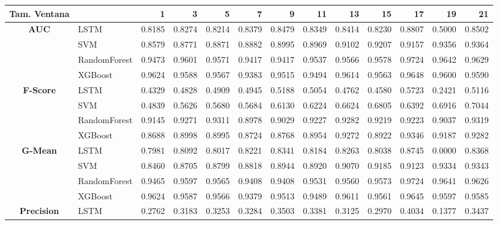 \begin{table}[h]
	\centering
	\begin{adjustbox}{max width=15cm}
		\begin{tabular}{|c|l|r|r|r|r|r|r|r|r|r|r|r|}
			\hline
			\textbf{Tam. Ventana}&         &      1  &      3  &      5  &      7  &      9  &      11 &      13 &      15 &      17 &      19 &      21 \\
			\hline
			\textbf{AUC} & LSTM &  0.8185 &  0.8274 &  0.8214 &  0.8379 &  0.8479 &  0.8349 &  0.8414 &  0.8230 &  0.8807 &  0.5000 &  0.8502 \\
			& SVM &  0.8579 &  0.8771 &  0.8871 &  0.8882 &  0.8995 &  0.8969 &  0.9102 &  0.9207 &  0.9157 &  0.9356 &  0.9364 \\
			& RandomForest &  0.9473 &  0.9601 &  0.9571 &  0.9417 &  0.9417 &  0.9537 &  0.9566 &  0.9578 &  0.9724 &  0.9642 &  0.9629 \\
			& XGBoost &  0.9624 &  0.9588 &  0.9567 &  0.9383 &  0.9515 &  0.9494 &  0.9614 &  0.9563 &  0.9648 &  0.9600 &  0.9590 \\
			\hline
			\textbf{F-Score} & LSTM &  0.4329 &  0.4828 &  0.4909 &  0.4945 &  0.5188 &  0.5054 &  0.4762 &  0.4580 &  0.5723 &  0.2421 &  0.5116 \\
			& SVM &  0.4839 &  0.5626 &  0.5680 &  0.5684 &  0.6130 &  0.6224 &  0.6624 &  0.6805 &  0.6392 &  0.6916 &  0.7044 \\
			& RandomForest &  0.9145 &  0.9271 &  0.9311 &  0.8978 &  0.9029 &  0.9227 &  0.9282 &  0.9219 &  0.9223 &  0.9037 &  0.9319 \\
			& XGBoost &  0.8688 &  0.8998 &  0.8995 &  0.8724 &  0.8768 &  0.8954 &  0.9272 &  0.8922 &  0.9346 &  0.9187 &  0.9282 \\
			\hline
			\textbf{G-Mean} & LSTM &  0.7981 &  0.8092 &  0.8017 &  0.8221 &  0.8341 &  0.8184 &  0.8263 &  0.8038 &  0.8745 &  0.0000 &  0.8368 \\
			& SVM &  0.8460 &  0.8705 &  0.8799 &  0.8818 &  0.8944 &  0.8920 &  0.9070 &  0.9185 &  0.9123 &  0.9334 &  0.9343 \\
			& RandomForest &  0.9465 &  0.9597 &  0.9565 &  0.9408 &  0.9408 &  0.9531 &  0.9560 &  0.9573 &  0.9724 &  0.9641 &  0.9626 \\
			& XGBoost &  0.9624 &  0.9587 &  0.9566 &  0.9379 &  0.9513 &  0.9489 &  0.9611 &  0.9561 &  0.9645 &  0.9597 &  0.9585 \\
			\hline
			\textbf{Precision} & LSTM &  0.2762 &  0.3183 &  0.3253 &  0.3284 &  0.3503 &  0.3381 &  0.3125 &  0.2970 &  0.4034 &  0.1377 &  0.3437 \\

\end{tabular}
\end{adjustbox}
\end{table}
